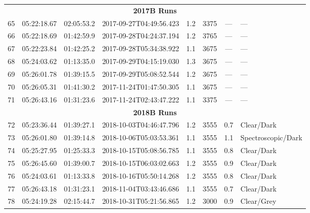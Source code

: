 \documentclass[12pt]{article}
\begin{document}
\begin{table}
\begin{center}
\begin{threeparttable}
\begin{tabular}{lccccccl}
	\multicolumn{8}{c}{{\bf 2017B Runs}} \\
	65 & 05:22:18.67 & 02:05:53.2 & 2017-09-27T04:49:56.423 & 1.2  & 3375 & ---      & ---                 \\
	66 & 05:22:18.69 & 01:42:59.9 & 2017-09-28T04:24:37.194 & 1.2  & 3765 & ---      & ---                 \\
	67 & 05:22:23.84 & 01:42:25.2 & 2017-09-28T05:34:38.922 & 1.1  & 3675 & ---      & ---                 \\
	68 & 05:24:03.62 & 01:13:35.0 & 2017-09-29T04:15:19.030 & 1.3  & 3675 & ---      & ---                 \\
	69 & 05:26:01.78 & 01:39:15.5 & 2017-09-29T05:08:52.544 & 1.2  & 3675 & ---      & ---                 \\
	70 & 05:26:05.31 & 01:41:30.2 & 2017-11-24T01:47:50.305 & 1.1  & 3675 & ---      & ---                 \\
	71 & 05:26:43.16 & 01:31:23.6 & 2017-11-24T02:43:47.222 & 1.1  & 3375 & ---      & ---                 \\
	\multicolumn{8}{c}{{\bf 2018B Runs}} \\
	72 & 05:23:36.44 & 01:39:27.1 & 2018-10-03T04:46:47.796 & 1.2  & 3555 & 0.7      & Clear/Dark          \\
	73 & 05:26:01.80 & 01:39:14.8 & 2018-10-06T05:03:53.361 & 1.1  & 3555 & 1.1      & Spectroscopic/Dark  \\
	74 & 05:25:27.95 & 01:25:33.3 & 2018-10-15T05:08:56.785 & 1.1  & 3555 & 0.8      & Clear/Dark          \\
	75 & 05:26:45.60 & 01:39:00.7 & 2018-10-15T06:03:02.663 & 1.2  & 3555 & 0.9      & Clear/Dark          \\
	76 & 05:24:03.61 & 01:13:33.8 & 2018-10-16T05:50:14.268 & 1.2  & 3555 & 0.8      & Clear/Dark          \\
	77 & 05:26:43.18 & 01:31:23.1 & 2018-11-04T03:43:46.686 & 1.1  & 3555 & 0.7      & Clear/Dark          \\
	78 & 05:24:19.28 & 02:15:44.7 & 2018-10-31T05:21:56.865 & 1.2  & 3000 & 0.9      & Clear/Grey          \\
	\bottomrule
	\end{tabular}
 \end{threeparttable}
\end{center}
\end{table}
\end{document}
